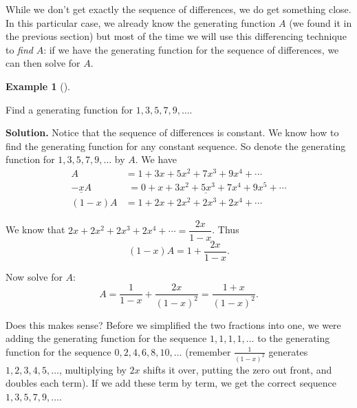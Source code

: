 \documentclass[10pt,]{book}
\theoremstyle{plain}
\theoremstyle{definition}
\newtheorem{example}[theorem]{Example}
\theoremstyle{definition}
\theoremstyle{definition}
\numberwithin{equation}{chapter}
\newcommand{\amp}{ & }
\begin{document}
While we don't get exactly the sequence of differences, we do get something close. In this particular case, we already know the generating function \(A\) (we found it in the previous section) but most of the time we will use this differencing technique to \emph{find} \(A\): if we have the generating function for the sequence of differences, we can then solve for \(A\).
%
\begin{example}[]\label{example-110}

Find a generating function for \(1, 3, 5, 7, 9,\ldots\).
%
\par\medskip\noindent%
\textbf{Solution.}\quad
Notice that the sequence of differences is constant. We know how to find the generating function for any constant sequence. So denote the generating function for \(1, 3, 5, 7, 9, \ldots\) by \(A\). We have
\begin{align*}
  A \amp  = 1 + 3x + 5x^2 + 7x^3 + 9x^4 + \cdots\\
  \underline{-xA} \amp  \underline{\,\,= 0 + x + 3x^2 +  5x^3 + 7x^4 + 9x^5 + \cdots}\\
  (1-x)A \amp  = 1 + 2x + 2x^2 + 2x^3 + 2x^4 + \cdots
\end{align*}
%
\par

We know that \(2x + 2x^2 + 2x^3 + 2x^4 + \cdots = \dfrac{2x}{1-x}\). Thus
\begin{equation*}
  (1-x)A = 1 + \frac{2x}{1-x}.
\end{equation*}
%
\par

Now solve for \(A\):
\begin{equation*}
  A = \frac{1}{1-x} + \frac{2x}{(1-x)^2} = \frac{1+x}{(1-x)^2}.
\end{equation*}
%
\par

Does this makes sense? Before we simplified the two fractions into one, we were adding the generating function for the sequence \(1,1,1,1,\ldots\) to the generating function for the sequence \(0, 2, 4, 6, 8, 10, \ldots\) (remember \(\frac{1}{(1-x)^2}\) generates \(1,2,3,4,5, \ldots\), multiplying by \(2x\) shifts it over, putting the zero out front, and doubles each term). If we add these term by term, we get the correct sequence \(1,3,5,7, 9, \ldots\).
%
\end{example}
\par
\end{document}
